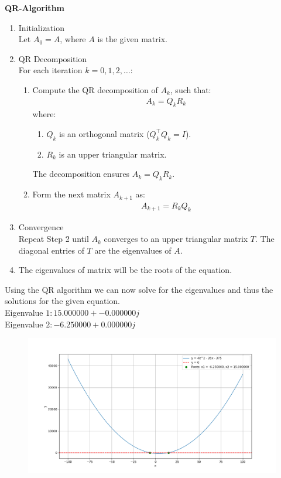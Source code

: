 \documentclass[journal]{IEEEtran}
\begin{document}
\textbf{QR-Algorithm}\\
\begin{enumerate}
\item Initialization \\
Let $A_0 = A $, where $A$ is the given matrix.

\item QR Decomposition \\
For each iteration $ k = 0, 1, 2, \dots $:
\begin{enumerate}
    \item Compute the QR decomposition of \( A_k \), such that:
    \begin{align}
    A_k = Q_k R_k
    \end{align}
    where:
    \begin{enumerate}
        \item $Q_k $ is an orthogonal matrix ($ Q_k^\top Q_k = I $).
        \item $ R_k $ is an upper triangular matrix.
    \end{enumerate}
    The decomposition ensures $ A_k = Q_k R_k $.

    \item Form the next matrix \( A_{k+1} \) as:
    \begin{align}
    A_{k+1} = R_k Q_k
    \end{align}
\end{enumerate}

\item Convergence\\
Repeat Step 2 until $ A_k $ converges to an upper triangular matrix $ T $. The diagonal entries of $T$ are the eigenvalues of $A$.\\
\item The eigenvalues of matrix will be the roots of the equation.


\end{enumerate}

Using the QR algorithm we can now solve for the eigenvalues and thus the solutions for the given equation.\\
Eigenvalue $1: 15.000000 + -0.000000j$\\
Eigenvalue $2: -6.250000 + 0.000000j$


\begin{figure}[h]
    \centering
    \includegraphics[width=\columnwidth]{figs/Figure_1.png}
    \label{fig:Plot}
    \end{figure}
\end{document}
